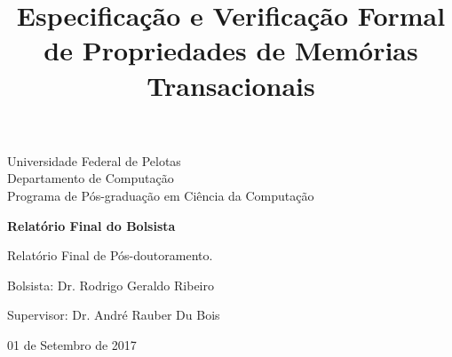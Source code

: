\documentclass[a4paper, 12pt]{article}
\begin{document}
\begin{titlepage}
    \begin{center}
    
        \Huge{Universidade Federal de Pelotas}\\
        \large{Departamento de Computação}\\ 
        \large{Programa de Pós-graduação em Ciência da Computação}\\ 
\vspace{15pt}
        
        \vspace{85pt}
        
        \textbf{\LARGE{Relatório Final do Bolsista}}
        \title{\large{Especificação e Verificação Formal de Propriedades de Memórias Transacionais}}
    \end{center}
\vspace{1,5cm}
    
    \begin{flushright}

   \begin{list}{}{
      \setlength{\leftmargin}{4.5cm}
      \setlength{\rightmargin}{0cm}
      \setlength{\labelwidth}{0pt}
      \setlength{\labelsep}{\leftmargin}}

      \item Relatório Final de Pós-doutoramento.

      \begin{list}{}{
      \setlength{\leftmargin}{0cm}
      \setlength{\rightmargin}{0cm}
      \setlength{\labelwidth}{0pt}
      \setlength{\labelsep}{\leftmargin}}

            \item Bolsista: Dr. Rodrigo Geraldo Ribeiro\
            \item Supervisor: Dr. André Rauber Du Bois\
      \end{list}
   \end{list}
\end{flushright}
\vspace{1cm}
\begin{center}
  \vspace{\fill}
  01 de Setembro de 2017\\
\end{center}
\end{titlepage}
\newpage
\newpage
\tableofcontents
\thispagestyle{empty}

\newpage
{}
\end{document}
